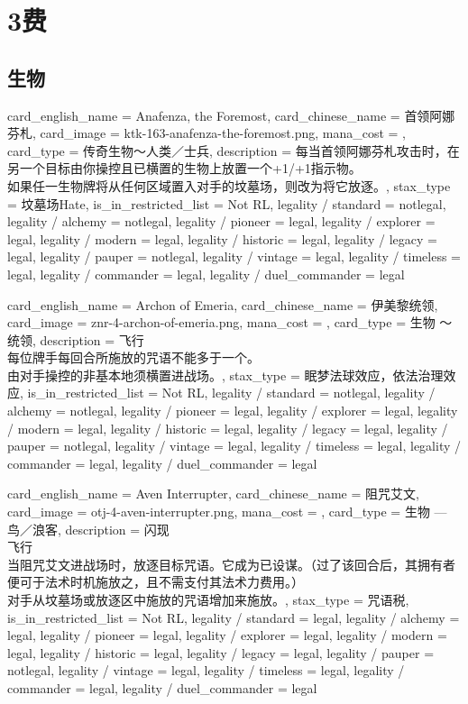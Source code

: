 \documentclass[lang = cn, color = black, 10pt]{AllThatStax}
\begin{document}
\chapter{3费}

\section{生物}

\card
{
	card_english_name = {Anafenza, the Foremost},
	card_chinese_name = {首领阿娜芬札},
	card_image = ktk-163-anafenza-the-foremost.png,
	mana_cost = ,
	card_type = 传奇生物～人类／士兵,
	description = {每当首领阿娜芬札攻击时，在另一个目标由你操控且已横置的生物上放置一个+1/+1指示物。\\
		如果任一生物牌将从任何区域置入对手的坟墓场，则改为将它放逐。},
	stax_type = 坟墓场Hate,
	is_in_restricted_list = Not RL,
	legality / standard = notlegal,
	legality / alchemy = notlegal,
	legality / pioneer = legal,
	legality / explorer = legal,
	legality / modern = legal,
	legality / historic = legal,
	legality / legacy = legal,
	legality / pauper = notlegal,
	legality / vintage = legal,
	legality / timeless = legal,
	legality / commander = legal,
	legality / duel_commander = legal
}

\card
{
	card_english_name = {Archon of Emeria},
	card_chinese_name = {伊美黎统领},
	card_image = znr-4-archon-of-emeria.png,
	mana_cost = ,
	card_type = 生物 ～统领,
	description = {飞行\\
		每位牌手每回合所施放的咒语不能多于一个。\\
		由对手操控的非基本地须横置进战场。},
	stax_type = 眠梦法球效应，依法治理效应,
	is_in_restricted_list = Not RL,
	legality / standard = notlegal,
	legality / alchemy = notlegal,
	legality / pioneer = legal,
	legality / explorer = legal,
	legality / modern = legal,
	legality / historic = legal,
	legality / legacy = legal,
	legality / pauper = notlegal,
	legality / vintage = legal,
	legality / timeless = legal,
	legality / commander = legal,
	legality / duel_commander = legal
}

\card
{
	card_english_name = {Aven Interrupter},
	card_chinese_name = {阻咒艾文},
	card_image = otj-4-aven-interrupter.png,
	mana_cost = ,
	card_type = 生物 — 鸟／浪客,
	description = {闪现\\
		飞行\\
		当阻咒艾文进战场时，放逐目标咒语。它成为已设谋。（过了该回合后，其拥有者便可于法术时机施放之，且不需支付其法术力费用。）\\
		对手从坟墓场或放逐区中施放的咒语增加来施放。},
	stax_type = 咒语税,
	is_in_restricted_list = Not RL,
	legality / standard = legal,
	legality / alchemy = legal,
	legality / pioneer = legal,
	legality / explorer = legal,
	legality / modern = legal,
	legality / historic = legal,
	legality / legacy = legal,
	legality / pauper = notlegal,
	legality / vintage = legal,
	legality / timeless = legal,
	legality / commander = legal,
	legality / duel_commander = legal
}
\end{document}
